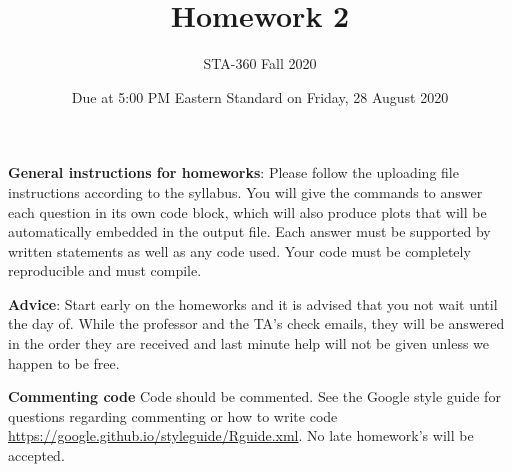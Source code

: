 \documentclass{article}
\begin{document}
\title{Homework 2}
\author{STA-360 Fall 2020}
\date{Due at 5:00 PM Eastern Standard  on Friday, 28 August 2020}
\maketitle



\textbf{General instructions for homeworks}: Please follow the uploading file instructions according to the syllabus. You will give the commands to answer each question in its own code block, which will also produce plots that will be automatically embedded in the output file. Each answer must be supported by written statements as well as any code used. Your code must be completely reproducible and must compile. 

\textbf{Advice}: Start early on the homeworks and it is advised that you not wait until the day of. While the professor and the TA's check emails, they will be answered in the order they are received and last minute help will not be given unless we happen to be free.  

\textbf{Commenting code}
Code should be commented. See the Google style guide for questions regarding commenting or how to write 
code \url{https://google.github.io/styleguide/Rguide.xml}. No late homework's will be accepted.
\end{document}
